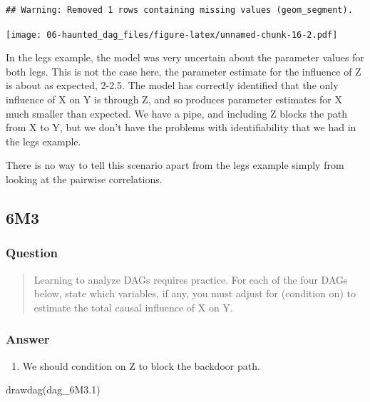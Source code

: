 \documentclass[
]{book}
\newenvironment{Shaded}{\begin{snugshade}}{\end{snugshade}}
\newcommand{\FloatTok}[1]{\textcolor[rgb]{0.00,0.00,0.81}{#1}}
\newcommand{\FunctionTok}[1]{\textcolor[rgb]{0.00,0.00,0.00}{#1}}
\newcommand{\NormalTok}[1]{#1}
\providecommand{\tightlist}{%
  \setlength{\itemsep}{0pt}\setlength{\parskip}{0pt}}
\begin{document}
\begin{verbatim}
## Warning: Removed 1 rows containing missing values (geom_segment).
\end{verbatim}

\texttt{[image: 06-haunted\_dag\_files/figure-latex/unnamed-chunk-16-2.pdf]}

In the legs example, the model was very uncertain about the parameter values for both legs. This is not the case here, the parameter estimate for the influence of Z is about as expected, 2-2.5. The model has correctly identified that the only influence of X on Y is through Z, and so produces parameter estimates for X much smaller than expected. We have a pipe, and including Z blocks the path from X to Y, but we don't have the problems with identifiability that we had in the legs example.

There is no way to tell this scenario apart from the legs example simply from looking at the pairwise correlations.

\hypertarget{m3-3}{%
\subsection*{6M3}\label{m3-3}}

\hypertarget{question-54}{%
\subsubsection*{Question}\label{question-54}}

\begin{quote}
Learning to analyze DAGs requires practice. For each of the four DAGs below, state which variables, if any, you must adjust for (condition on) to estimate the total causal influence of X on Y.
\end{quote}

\hypertarget{answer-54}{%
\subsubsection*{Answer}\label{answer-54}}

\begin{enumerate}
\def\labelenumi{\arabic{enumi}.}
\tightlist
\item
  We should condition on Z to block the backdoor path.
\end{enumerate}

\begin{Shaded}
\begin{Highlighting}[]
\FunctionTok{drawdag}\NormalTok{(dag\_6M3}\FloatTok{.1}\NormalTok{)}
\end{Highlighting}
\end{Shaded}
\end{document}
